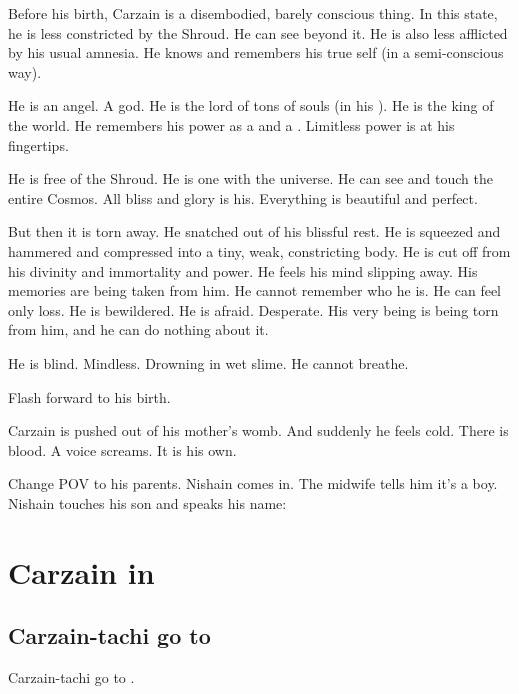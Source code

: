 Before his birth, Carzain is a disembodied, barely conscious thing. 
In this state, he is less constricted by the Shroud. 
He can see beyond it.
He is also less afflicted by his usual \malach amnesia.
He knows and remembers his true self (in a semi-conscious way). 

He is an angel.
A god. 
He is the lord of tons of souls (in his \carcer).
He is the king of the world. 
He remembers his power as a \sathariah and a \malach.
Limitless power is at his fingertips. 

He is free of the Shroud. 
He is one with the universe. 
He can see and touch the entire Cosmos.
All bliss and glory is his. 
Everything is beautiful and perfect. 

But then it is torn away. 
He snatched out of his blissful rest. 
He is squeezed and hammered and compressed into a tiny, weak, constricting body. 
He is cut off from his divinity and immortality and power. 
He feels his mind slipping away.
His memories are being taken from him. 
He cannot remember who he is.
He can feel only loss. 
He is bewildered. 
He is afraid.
Desperate. 
His very being is being torn from him, and he can do nothing about it. 

He is blind. 
Mindless. 
Drowning in wet slime. 
He cannot breathe.

Flash forward to his birth.

Carzain is pushed out of his mother's womb. 
And suddenly he feels cold. 
There is blood.
A voice screams.
It is his own. 

Change POV to his parents. 
Nishain comes in. 
The midwife tells him it's a boy. 
Nishain touches his son and speaks his name: 



















\section{Carzain in \Redce}









\subsection{Carzain-tachi go to \Redce}
Carzain-tachi go to \Redce. 





